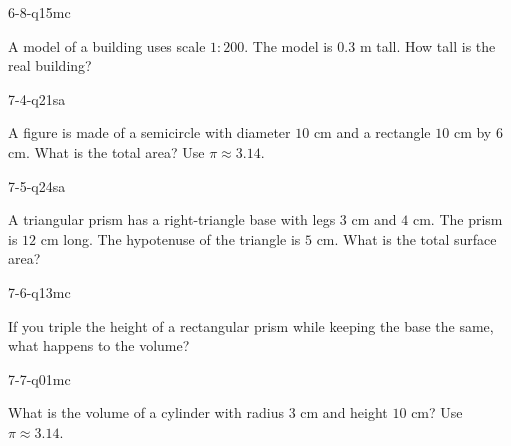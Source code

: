 \begin{practiceQuestion}{6-8-q15}{mc}
\begin{questionText}
A model of a building uses scale $1:200$. The model is $0.3$ m tall. How tall is the real building?
\end{questionText}
\end{practiceQuestion}

\begin{practiceQuestion}{7-4-q21}{sa}
\begin{questionText}
A figure is made of a semicircle with diameter $10$ cm and a rectangle $10$ cm by $6$ cm. What is the total area? Use $\pi \approx 3.14$.
\end{questionText}
\end{practiceQuestion}

\begin{practiceQuestion}{7-5-q24}{sa}
\begin{questionText}
A triangular prism has a right-triangle base with legs $3$ cm and $4$ cm. The prism is $12$ cm long. The hypotenuse of the triangle is $5$ cm. What is the total surface area?
\end{questionText}
\end{practiceQuestion}

\begin{practiceQuestion}{7-6-q13}{mc}
\begin{questionText}
If you triple the height of a rectangular prism while keeping the base the same, what happens to the volume?
\end{questionText}
\end{practiceQuestion}

\begin{practiceQuestion}{7-7-q01}{mc}
\begin{questionText}
What is the volume of a cylinder with radius $3$ cm and height $10$ cm? Use $\pi \approx 3.14$.
\end{questionText}
\end{practiceQuestion}


